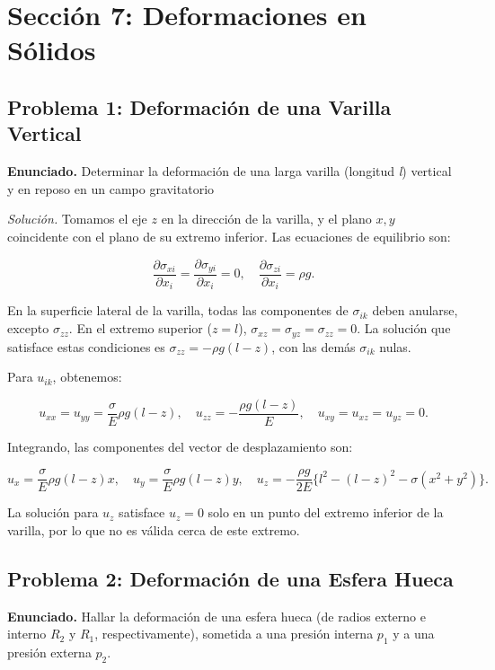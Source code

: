 \documentclass{article}
\begin{document}
\section*{Sección 7: Deformaciones en Sólidos}

\subsection*{Problema 1: Deformación de una Varilla Vertical}
\textbf{Enunciado.} Determinar la deformación de una larga varilla (longitud \textit{l}) vertical y en reposo en un campo gravitatorio

\textit{Solución.} Tomamos el eje $z$ en la dirección de la varilla, y el plano $x, y$ coincidente con el plano de su extremo inferior. Las ecuaciones de equilibrio son:

$$
\frac{\partial \sigma_{xi}}{\partial x_{i}} = \frac{\partial \sigma_{yi}}{\partial x_{i}} = 0, \quad \frac{\partial \sigma_{zi}}{\partial x_{i}} = \rho g.
$$

En la superficie lateral de la varilla, todas las componentes de $\sigma_{ik}$ deben anularse, excepto $\sigma_{zz}$. En el extremo superior ($z = l$), $\sigma_{xz} = \sigma_{yz} = \sigma_{zz} = 0$. La solución que satisface estas condiciones es $\sigma_{zz} = -\rho g(l - z)$, con las demás $\sigma_{ik}$ nulas.

Para $u_{ik}$, obtenemos:

$$
u_{xx} = u_{yy} = \frac{\sigma}{E}\rho g(l - z), \quad u_{zz} = -\frac{\rho g(l - z)}{E}, \quad u_{xy} = u_{xz} = u_{yz} = 0.
$$

Integrando, las componentes del vector de desplazamiento son:

$$
u_x = \frac{\sigma}{E}\rho g(l - z)x, \quad u_y = \frac{\sigma}{E}\rho g(l - z)y, \quad u_z = -\frac{\rho g}{2E} \{l^2 - (l - z)^2 - \sigma(x^2 + y^2)\}.
$$

La solución para $u_z$ satisface $u_z = 0$ solo en un punto del extremo inferior de la varilla, por lo que no es válida cerca de este extremo.

\subsection*{Problema 2: Deformación de una Esfera Hueca}
\textbf{Enunciado.} Hallar la deformación de una esfera hueca (de radios externo e interno $R_2$ y $R_1$, respectivamente), sometida a una presión interna $p_1$ y a una presión externa $p_2$.
\end{document}
